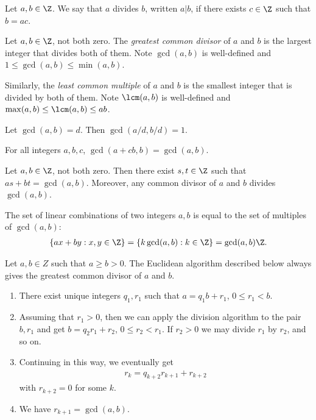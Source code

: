 \documentclass{article}
\begin{document}
\begin{definition}
    Let $a,b\in\Z$. We say that $a$ divides $b$, written $a|b$, if there exists $c\in\Z$
    such that $b=ac$.
\end{definition}

\begin{definition}
    Let $a,b\in\Z$, not both zero. The \emph{greatest common divisor} of $a$ and $b$ is the largest integer
    that divides both of them. Note $\gcd(a,b)$ is well-defined and $1\leq\gcd(a,b)\leq\min(a,b)$.

    Similarly, the \emph{least common multiple} of $a$ and $b$ is the smallest 
    integer that is divided by both of them. Note $\lcm(a,b)$ is well-defined
    and $\max(a,b)\leq\lcm(a,b)\leq ab$.
\end{definition}

\begin{proposition}[Boocher 3.3]
    Let $\gcd(a,b)=d$. Then $\gcd(a/d,b/d)=1$.
\end{proposition}

\begin{proposition}[Boocher 3.4]
    For all integers $a,b,c$, $\gcd(a+cb,b)=\gcd(a,b)$.
\end{proposition}

\begin{lemma}[Bezout]
    Let $a,b\in\Z$, not both zero. Then there exist $s,t\in\Z$ such that
    $as + bt = \gcd(a,b)$. Moreover, any common divisor of $a$ and $b$ divides $\gcd(a,b)$.
\end{lemma}

\begin{corollary}[Boocher 3.7]
    The set of linear combinations of two integers $a,b$ is equal to the set 
    of multiples of $\gcd(a,b)$:
    \begin{align*}
        \{ax+by : x,y\in\Z \} = \{k\gcd(a,b):k\in\Z\}=\gcd(a,b)\Z.
    \end{align*}
\end{corollary}

\begin{theorem}
    Let $a,b\in Z$ such that $a\geq b>0$.
    The Euclidean algorithm described below always gives the greatest common divisor of
    $a$ and $b$.
    \begin{enumerate}
        \item There exist unique integers $q_1,r_1$ such that $a=q_1b+r_1$, $0\leq r_1<b$.
        \item Assuming that $r_1>0$, then we can apply the division algorithm to the pair
              $b,r_1$ and get $b=q_2r_1 + r_2$, $0\leq r_2<r_1$. If $r_2>0$ we may divide
              $r_1$ by $r_2$, and so on.
        \item Continuing in this way, we eventually get \begin{align*}
                  r_k=q_{k+2}r_{k+1}+r_{k+2}
              \end{align*}
              with $r_{k+2}=0$ for some $k$.
        \item We have $r_{k+1}=\gcd(a,b)$.
    \end{enumerate}
\end{theorem}
\end{document}
